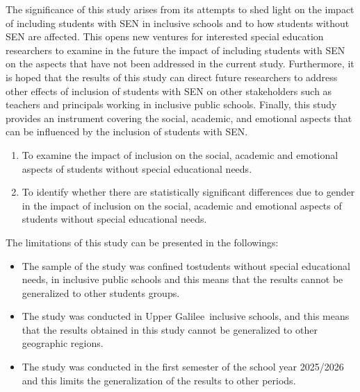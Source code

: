 \documentclass[10pt]{NSP1}
\begin{document}
\par\medskip{}\smallskip

The significance of this study arises from its attempts to shed light on the impact of including students with SEN in inclusive schools and to how students without SEN are affected. This opens new ventures for interested special education researchers to examine in the future the impact of including students with SEN on the aspects that have not been addressed in the current study. Furthermore, it is hoped that the results of this study can direct future researchers to address other effects of inclusion of students with SEN on other stakeholders such as teachers and principals working in inclusive public schools. Finally, this study provides an instrument covering the social, academic, and emotional aspects that can be influenced by the inclusion of students with SEN.

\par\medskip{}\smallskip

\begin{enumerate}
  \item To examine the impact of inclusion on the social, academic and emotional aspects of students without special educational needs.
  \item To identify whether there are statistically significant differences due to gender in the impact of inclusion on the social, academic and emotional aspects of students without special educational needs.
\end{enumerate}

\par\medskip{}\smallskip

The limitations of this study can be presented in the followings:

\begin{itemize}
  \item The sample of the study was confined tostudents without special educational needs, in inclusive public schools and this means that the results cannot be generalized to other students groups.
  \item The study was conducted in Upper Galilee~inclusive schools, and this means that the results obtained in this study cannot be generalized to other geographic regions.
  \item The study was conducted in the first semester of the school year 2025/2026 and this limits the generalization of the results to other periods.
\end{itemize}
\end{document}
